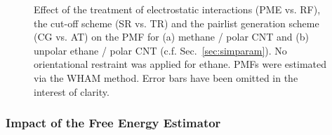 \documentclass[9pt,lessons]{livecoms}
\begin{document}
\begin{figure}[htb!]
  \centering    
  \caption{Effect of the treatment of electrostatic interactions (PME vs. RF), the cut-off scheme (SR vs. TR) and the pairlist generation scheme (CG vs. AT) on the PMF for (a) methane / polar CNT 
  and (b) unpolar ethane / polar CNT (c.f. Sec.~\ref{sec:simparam}). 
  No orientational restraint was applied for ethane. 
  PMFs were estimated via the WHAM method.
  Error bars have been omitted in the interest of clarity. 
}  
\label{fig:UP_LigCNT_electrst}
\end{figure}


\subsubsection*{Impact of the Free Energy Estimator}
\end{document}
